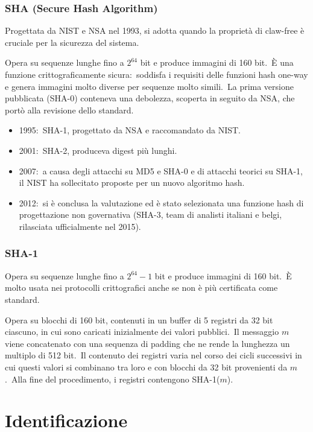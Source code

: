 \subsubsection{SHA (Secure Hash Algorithm)}

Progettata da NIST e NSA nel 1993, si adotta quando la proprietà di claw-free è cruciale per la sicurezza del sistema.\

Opera su sequenze lunghe fino a $2^{64}$ bit e produce immagini di 160 bit.\
È una funzione crittograficamente sicura:\ soddisfa i requisiti delle funzioni hash one-way e genera immagini molto diverse per sequenze molto simili.\
La prima versione pubblicata (SHA-0) conteneva una debolezza, scoperta in seguito da NSA, che portò alla revisione dello standard.\

\begin{itemize}
    \item 1995:\ SHA-1, progettato da NSA e raccomandato da NIST.
    \item 2001:\ SHA-2, produceva digest più lunghi.
    \item 2007:\ a causa degli attacchi su MD5 e SHA-0 e di attacchi teorici su SHA-1, il NIST ha sollecitato proposte per un nuovo algoritmo hash.\
    \item 2012:\ si è conclusa la valutazione ed è stato selezionata una funzione hash di progettazione non governativa (SHA-3, team di analisti italiani e belgi, rilasciata ufficialmente nel 2015).\
\end{itemize}

\subsubsection{SHA-1}

Opera su sequenze lunghe fino a $2^{64} - 1$ bit e produce immagini di 160 bit.\
È molto usata nei protocolli crittografici anche se non è più certificata come standard.\

Opera su blocchi di 160 bit, contenuti in un buffer di 5 registri da 32 bit ciascuno, in cui sono caricati inizialmente dei valori pubblici.\
Il messaggio $m$ viene concatenato con una sequenza di padding che ne rende la lunghezza un multiplo di 512 bit.\
Il contenuto dei registri varia nel corso dei cicli successivi in cui questi valori si combinano tra loro e con blocchi da 32 bit provenienti da $m$.\
Alla fine del procedimento, i registri contengono SHA-1($m$).\

\section{Identificazione}

